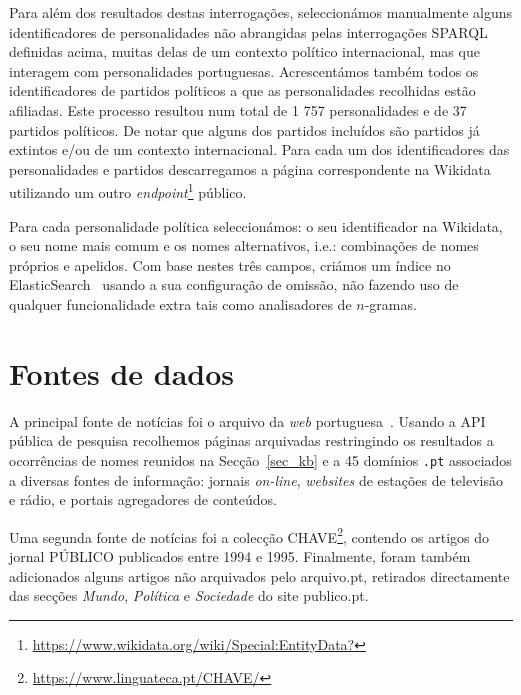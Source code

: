 \documentclass[a4paper, twocolumn, 11pt, twoside]{article}
\begin{document}
Para além dos resultados destas interrogações, seleccionámos manualmente alguns identificadores de personalidades não abrangidas pelas interrogações SPARQL definidas acima, muitas delas de um contexto político internacional, mas que interagem com personalidades portuguesas. Acrescentámos também todos os identificadores de partidos políticos a que as personalidades recolhidas estão afiliadas. Este processo resultou num total de 1 757 personalidades e de 37 partidos políticos. De notar que alguns dos partidos incluídos são partidos já extintos e/ou de um contexto internacional. Para cada um dos identificadores das personalidades e partidos descarregamos a página correspondente na Wikidata utilizando um outro \textit{endpoint}\footnote{\url{https://www.wikidata.org/wiki/Special:EntityData?}} público.


Para cada personalidade política seleccionámos: o seu identificador na Wikidata, o seu nome mais comum e os nomes alternativos, i.e.: combinações de nomes próprios e apelidos. Com base nestes três campos, criámos um índice no ElasticSearch~\citep{10.5555/2904394} usando a sua configuração de omissão, não fazendo uso de qualquer funcionalidade extra tais como analisadores de $n$-gramas.

\section{Fontes de dados}
\label{sec:data_sources}

A principal fonte de notícias foi o arquivo da \textit{web} portuguesa~\citep{SearchPastPWA2013}. Usando a API pública de pesquisa recolhemos páginas arquivadas restringindo os resultados a ocorrências de nomes reunidos na Secção~\ref{sec_kb} e a 45 domínios \texttt{.pt} associados a diversas fontes de informação: jornais \textit{on-line}, \textit{websites} de estações de televisão e rádio, e portais agregadores de conteúdos. 

Uma segunda fonte de notícias foi a colecção CHAVE\footnote{\url{https://www.linguateca.pt/CHAVE/}}\citep{DBLP:conf/clef/SantosR04, santos-rocha-2001-evaluating}, contendo os artigos do jornal PÚBLICO publicados entre 1994 e 1995. Finalmente, foram também adicionados alguns artigos não arquivados pelo arquivo.pt, retirados directamente das secções {\it Mundo}, {\it Política} e {\it Sociedade} do site publico.pt. 
\end{document}
